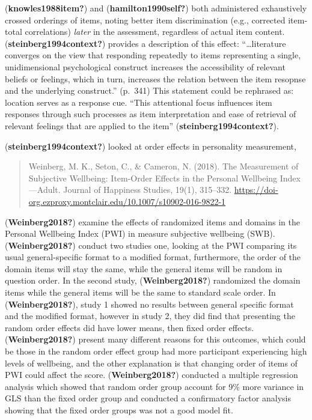 \documentclass[
  man]{apa7}
\begin{document}
(\textbf{knowles1988item?}) and (\textbf{hamilton1990self?}) both administered exhaustively crossed orderings of items, noting better item discrimination (e.g., corrected item-total correlations) \emph{later} in the assessment, regardless of actual item content. (\textbf{steinberg1994context?}) provides a description of this effect: ``\ldots literature converges on the view that responding repeatedly to items representing a single, unidimensional psychological construct increases the accessibility of relevant beliefs or feelings, which in turn, increases the relation between the item resopnse and the underlying construct.'' (p.~341) This statement could be rephrased as: location serves as a response cue. ``This attentional focus influences item responses through such processes as item interpretation and ease of retrieval of relevant feelings that are applied to the item'' (\textbf{steinberg1994context?}).

(\textbf{steinberg1994context?}) looked at order effects in personality measurement,

\begin{quote}
Weinberg, M. K., Seton, C., \& Cameron, N. (2018). The Measurement of Subjective Wellbeing: Item-Order Effects in the Personal Wellbeing Index---Adult. Journal of Happiness Studies, 19(1), 315--332. \url{https://doi-org.ezproxy.montclair.edu/10.1007/s10902-016-9822-1}
\end{quote}

(\textbf{Weinberg2018?}) examine the effects of randomized items and domains in the Personal Wellbeing Index (PWI) in measure subjective wellbeing (SWB). (\textbf{Weinberg2018?}) conduct two studies one, looking at the PWI comparing its usual general-specific format to a modified format, furthermore, the order of the domain items will stay the same, while the general items will be random in question order. In the second study, (\textbf{Weinberg2018?}) randomized the domain items while the general items will be the same to standard scale order. In (\textbf{Weinberg2018?}), study 1 showed no results between general specific format and the modified format, however in study 2, they did find that presenting the random order effects did have lower means, then fixed order effects. (\textbf{Weinberg2018?}) present many different reasons for this outcomes, which could be those in the random order effect group had more participant experiencing high levels of wellbeing, and the other explanation is that changing order of items of PWI could affect the score. (\textbf{Weinberg2018?}) conducted a multiple regression analysis which showed that random order group account for 9\% more variance in GLS than the fixed order group and conducted a confirmatory factor analysis showing that the fixed order groups was not a good model fit.
\end{document}
